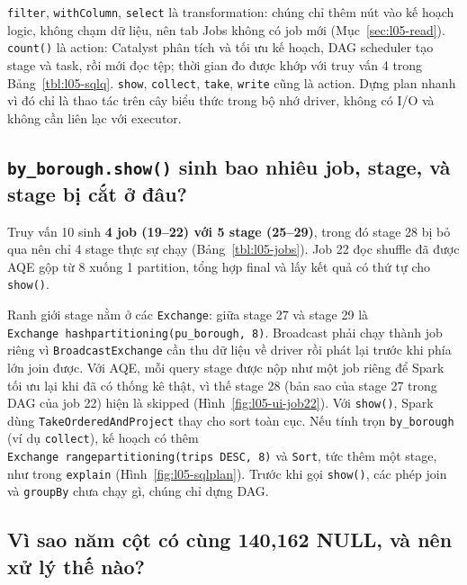 \documentclass[
  12pt,
  a4paper,
]{report}
\begin{document}
\texttt{filter}, \texttt{withColumn}, \texttt{select} là transformation:
chúng chỉ thêm nút vào kế hoạch logic, không chạm dữ liệu, nên tab Jobs
không có job mới (Mục~\ref{sec:l05-read}). \texttt{count()} là action:
Catalyst phân tích và tối ưu kế hoạch, DAG scheduler tạo stage và task,
rồi mới đọc tệp; thời gian đo được khớp với truy vấn 4 trong
Bảng~\ref{tbl:l05-sqlq}. \texttt{show}, \texttt{collect}, \texttt{take},
\texttt{write} cũng là action. Dựng plan nhanh vì đó chỉ là thao tác
trên cây biểu thức trong bộ nhớ driver, không có I/O và không cần liên
lạc với executor.

\subsection{\texorpdfstring{\texttt{by\_}\allowbreak{}\texttt{borough.}\allowbreak{}\texttt{show()}\allowbreak{}
sinh bao nhiêu job, stage, và stage bị cắt ở
đâu?}{by\_borough.show() sinh bao nhiêu job, stage, và stage bị cắt ở đâu?}}\label{sec:l05-q3}

Truy vấn 10 sinh \textbf{4 job (19--22) với 5 stage (25--29)}, trong đó
stage 28 bị bỏ qua nên chỉ 4 stage thực sự chạy
(Bảng~\ref{tbl:l05-jobs}). Job 22 đọc shuffle đã được AQE gộp từ 8 xuống
1 partition, tổng hợp final và lấy kết quả có thứ tự cho
\texttt{show()}.

Ranh giới stage nằm ở các \texttt{Exchange}: giữa stage 27 và stage 29
là
\texttt{Exchange\ hashpartitioning(pu\_}\allowbreak{}\texttt{borough,}\allowbreak{}\texttt{\ 8)}\allowbreak{}.
Broadcast phải chạy thành job riêng vì
\texttt{BroadcastExchange}\allowbreak{} cần thu dữ liệu về driver rồi
phát lại trước khi phía lớn join được. Với AQE, mỗi query stage được nộp
như một job riêng để Spark tối ưu lại khi đã có thống kê thật, vì thế
stage 28 (bản sao của stage 27 trong DAG của job 22) hiện là skipped
(Hình~\ref{fig:l05-ui-job22}). Với \texttt{show()}, Spark dùng
\texttt{TakeOrderedAndProject}\allowbreak{} thay cho sort toàn cục. Nếu
tính trọn \texttt{by\_borough} (ví dụ \texttt{collect}), kế hoạch có
thêm
\texttt{Exchange\ rangepartitioning(trips\ DESC,}\allowbreak{}\texttt{\ 8)}\allowbreak{}
và \texttt{Sort}, tức thêm một stage, như trong \texttt{explain}
(Hình~\ref{fig:l05-sqlplan}). Trước khi gọi \texttt{show()}, các phép
join và \texttt{groupBy} chưa chạy gì, chúng chỉ dựng DAG.

\subsection{Vì sao năm cột có cùng 140,162 NULL, và nên xử lý thế
nào?}\label{sec:l05-q4}
\end{document}
